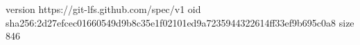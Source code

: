 version https://git-lfs.github.com/spec/v1
oid sha256:2d27efcec01660549d9b8c35e1f02101ed9a7235944322614ff33ef9b695c0a8
size 846
